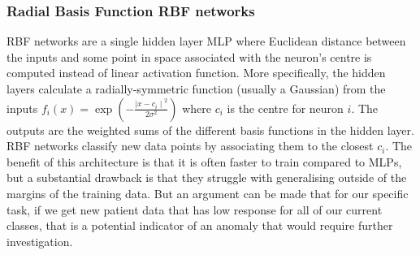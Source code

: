 \documentclass[11pt,a4paper]{article}
\begin{document}

\subsubsection{Radial Basis Function RBF networks}
RBF networks are a single hidden layer MLP where Euclidean distance between the inputs and some point in space associated with the neuron's centre is computed instead of linear activation function. More specifically, the hidden layers calculate a radially-symmetric function (usually a Gaussian) from the inputs \(f_i(x) = \exp \left(-\frac{{\mid x - c_i \mid}^2}{2 \sigma^2} \right) \) where \(c_i\) is the centre for neuron \(i\). The outputs are the weighted sums of the different basis functions in the hidden layer.
RBF networks classify new data points by associating them to the closest \(c_i\). The benefit of this architecture is that it is often faster to train compared to MLPs, but a substantial drawback is that they struggle with generalising outside of the margins of the training data. But an argument can be made that for our specific task, if we get new patient data that has low response for all of our current classes, that is a potential indicator of an anomaly that would require further investigation.
\end{document}
